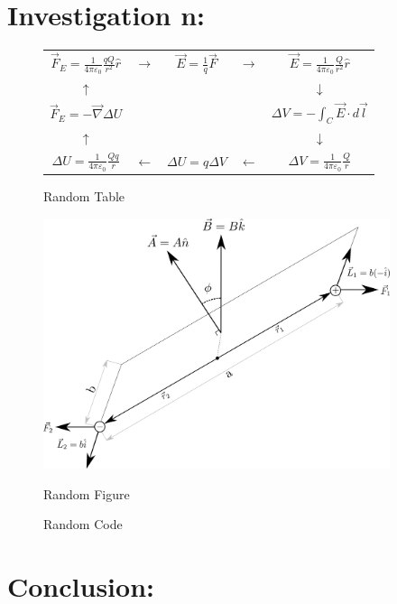 \documentclass[12pt,a4paper]{article}
\begin{document}
	\section*{Investigation n:}	
		\begin{figure}[H]
			\centering
			\begin{tabular}{ccccc}
				\(\displaystyle \vec{F}_E = \frac{1}{4 \pi \varepsilon_0} \frac{qQ}{r^2} \hat{r} \) &
				$\rightarrow$ & 
				$\displaystyle \vec{E} = \frac{1}{q} \vec{F}$ & 
				$\rightarrow$ &
				\(\displaystyle \vec{E} = \frac{1}{4 \pi \varepsilon_0} \frac{Q}{r^2} \hat{r} \)\\
				$\uparrow$ & & & & $\downarrow$\\
				\(\displaystyle \vec{F}_E = - \vec{\nabla} \Delta U\) & & & &
				\(\displaystyle \Delta V = - \int_C \vec{E} \cdot d\vec{l}\)\\
				$\uparrow$ & & & & $\downarrow$\\
				\(\displaystyle \Delta U = \frac{1}{4 \pi \varepsilon_0} \frac{Qq}{r} \) &
				$\leftarrow$ & 
				$\Delta U = q \Delta V$ & 
				$\leftarrow$ &
				\(\displaystyle \Delta V = \frac{1}{4 \pi \varepsilon_0} \frac{Q}{r} \)
			\end{tabular}
			\caption{Random Table}
		\end{figure}
		\begin{figure}[H]
			\centering
			\includegraphics[width=4in]{RandFigure}\\
			\caption{Random Figure}
		\end{figure}
		\begin{figure}[H]
			
			\centering
			\caption{Random Code}
		\end{figure}
		
		
	\section*{Conclusion:}
		
\end{document}
